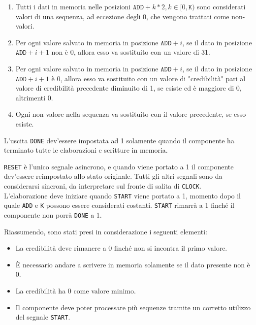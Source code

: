 \documentclass{article}
\begin{document}
\begin{enumerate}
    \item Tutti i dati in memoria nelle posizioni $\texttt{ADD} + k*2, k \in [0, \texttt{K})$ sono considerati valori di una sequenza, ad eccezione degli 0, che vengono trattati come non-valori.
    \item Per ogni valore salvato in memoria in posizione $\texttt{ADD}+i$, se il dato in posizione $\texttt{ADD}+i+1$ non è 0, allora esso va sostituito con un valore di  31.
    \item Per ogni valore salvato in memoria in posizione $\texttt{ADD}+i$, se il dato in posizione $\texttt{ADD}+i+1$ è 0, allora esso va sostituito con un valore di "credibilità" pari al valore di credibilità precedente diminuito di 1, se esiste ed è maggiore di 0, altrimenti 0.
    \item Ogni non valore nella sequenza va sostituito con il valore precedente, se esso esiste.
\end{enumerate}

L'uscita \texttt{DONE} dev'essere impostata ad 1 solamente quando il componente ha terminato tutte le elaborazioni e scritture in memoria.

\texttt{RESET} è l'unico segnale asincrono, e quando viene portato a 1 il componente dev'essere reimpostato allo stato originale. Tutti gli altri segnali sono da considerarsi sincroni, da interpretare sul fronte di salita di \texttt{CLOCK}. \\

L'elaborazione deve iniziare quando \texttt{START} viene portato a 1, momento dopo il quale \texttt{ADD} e \texttt{K} possono essere considerati costanti. \texttt{START} rimarrà a 1 finché il componente non porrà \texttt{DONE} a 1.

Riassumendo, sono stati presi in considerazione i seguenti elementi:
\label{par:casi-notevoli}
\begin{itemize}
    \item La credibilità deve rimanere a 0 finché non si incontra il primo valore.
    \item È necessario andare a scrivere in memoria solamente se il dato presente non è 0.
    \item La credibilità ha 0 come valore minimo.
    \item Il componente deve poter processare più sequenze tramite un corretto utilizzo del segnale \texttt{START}.
\end{itemize}
\end{document}
